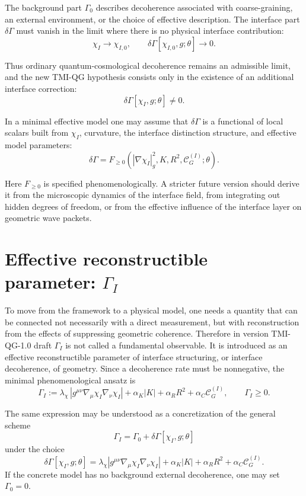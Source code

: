 \documentclass[12pt,a4paper]{article}
\begin{document}
The background part $\Gamma_0$ describes decoherence associated with coarse-graining, an external environment, or the choice of effective description. The interface part $\delta\Gamma$ must vanish in the limit where there is no physical interface contribution:
\[
\boxed{
\chi_I\to\chi_{I,0},
\qquad
\delta\Gamma[\chi_{I,0},g;\theta]\to0.
}
\]

Thus ordinary quantum-cosmological decoherence remains an admissible limit, and the new TMI-QG hypothesis consists only in the existence of an additional interface correction:
\[
\boxed{
\delta\Gamma[\chi_I,g;\theta]\neq0.
}
\]

In a minimal effective model one may assume that $\delta\Gamma$ is a functional of local scalars built from $\chi_I$, curvature, the interface distinction structure, and effective model parameters:
\[
\boxed{
\delta\Gamma
=
F_{\ge0}
\left(
|\nabla\chi_I|_g^2,
K,
R^2,
\mathcal C_G^{(I)};\theta
\right).
}
\]

Here $F_{\ge0}$ is specified phenomenologically. A stricter future version should derive it from the microscopic dynamics of the interface field, from integrating out hidden degrees of freedom, or from the effective influence of the interface layer on geometric wave packets.

\section{Effective reconstructible parameter: \texorpdfstring{$\Gamma_I$}{Gamma I}}

To move from the framework to a physical model, one needs a quantity that can be connected not necessarily with a direct measurement, but with reconstruction from the effects of suppressing geometric coherence. Therefore in version TMI-QG-1.0 draft $\Gamma_I$ is not called a fundamental observable. It is introduced as an effective reconstructible parameter of interface structuring, or interface decoherence, of geometry. Since a decoherence rate must be nonnegative, the minimal phenomenological ansatz is
\[
\boxed{
\Gamma_I
:=
\lambda_\chi\,\left|g^{\mu\nu}\nabla_\mu\chi_I\nabla_\nu\chi_I\right|
+
\alpha_K |K|
+
\alpha_R R^2
+
\alpha_C\mathcal C_G^{(I)},
\qquad
\Gamma_I\ge0.
}
\]

The same expression may be understood as a concretization of the general scheme
\[
\boxed{
\Gamma_I
=
\Gamma_0
+
\delta\Gamma[\chi_I,g;\theta]
}
\]
under the choice
\[
\boxed{
\delta\Gamma[\chi_I,g;\theta]
=
\lambda_\chi\left|g^{\mu\nu}\nabla_\mu\chi_I\nabla_\nu\chi_I\right|
+
\alpha_K |K|
+
\alpha_R R^2
+
\alpha_C\mathcal C_G^{(I)}.
}
\]
If the concrete model has no background external decoherence, one may set $\Gamma_0=0$.
\end{document}
